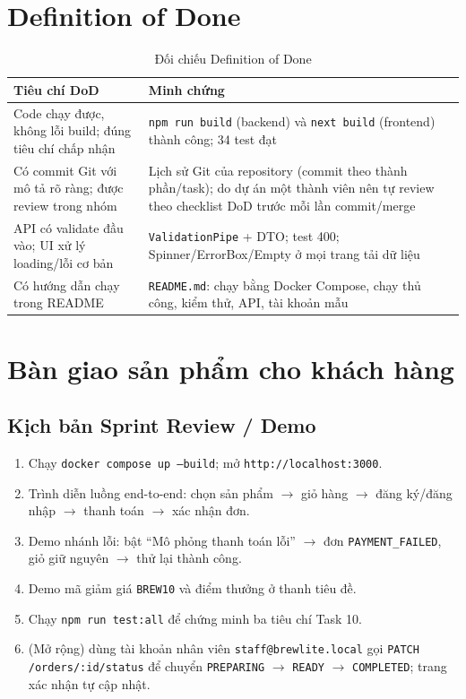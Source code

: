 \documentclass[a4paper]{article}
\newcommand{\st}[1]{\texttt{#1}}
\begin{document}
\section{Definition of Done}\label{sec:dod}
\begin{table}[h!]
\centering
\begin{tabularx}{\textwidth}{|X|L{6.6cm}|}
\hline
\textbf{Tiêu chí DoD} & \textbf{Minh chứng} \\ \hline
Code chạy được, không lỗi build; đúng tiêu chí chấp nhận & \texttt{npm run build} (backend) và \texttt{next build} (frontend) thành công; 34 test đạt \\ \hline
Có commit Git với mô tả rõ ràng; được review trong nhóm & Lịch sử Git của repository (commit theo thành phần/task); do dự án một thành viên nên tự review theo checklist DoD trước mỗi lần commit/merge \\ \hline
API có validate đầu vào; UI xử lý loading/lỗi cơ bản & \texttt{ValidationPipe} + DTO; test 400; Spinner/ErrorBox/Empty ở mọi trang tải dữ liệu \\ \hline
Có hướng dẫn chạy trong README & \texttt{README.md}: chạy bằng Docker Compose, chạy thủ công, kiểm thử, API, tài khoản mẫu \\ \hline
\end{tabularx}
\caption{Đối chiếu Definition of Done}
\end{table}

\section{Bàn giao sản phẩm cho khách hàng}\label{sec:handover}
\subsection{Kịch bản Sprint Review / Demo}
\begin{enumerate}
  \item Chạy \texttt{docker compose up --build}; mở \texttt{http://localhost:3000}.
  \item Trình diễn luồng end-to-end: chọn sản phẩm $\to$ giỏ hàng $\to$ đăng ký/đăng nhập $\to$ thanh toán $\to$ xác nhận đơn.
  \item Demo nhánh lỗi: bật ``Mô phỏng thanh toán lỗi'' $\to$ đơn \st{PAYMENT\_FAILED}, giỏ giữ nguyên $\to$ thử lại thành công.
  \item Demo mã giảm giá \texttt{BREW10} và điểm thưởng ở thanh tiêu đề.
  \item Chạy \texttt{npm run test:all} để chứng minh ba tiêu chí Task 10.
  \item (Mở rộng) dùng tài khoản nhân viên \texttt{staff@brewlite.local} gọi \texttt{PATCH /orders/:id/status} để chuyển \st{PREPARING} $\to$ \st{READY} $\to$ \st{COMPLETED}; trang xác nhận tự cập nhật.
\end{enumerate}
\end{document}
